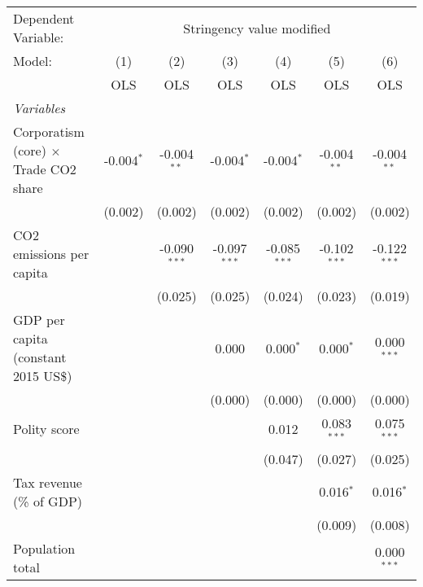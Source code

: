 
\begingroup
\centering
\begin{tabular}{lcccccc}
   \toprule
   Dependent Variable: & \multicolumn{6}{c}{Stringency value modified}\\
   Model:                                       & (1)          & (2)            & (3)            & (4)            & (5)            & (6)\\  
                                                &  OLS         & OLS            & OLS            & OLS            & OLS            & OLS\\  
   \midrule
   \emph{Variables}\\
   Corporatism (core) $\times$ Trade CO2 share  & -0.004$^{*}$ & -0.004$^{**}$  & -0.004$^{*}$   & -0.004$^{*}$   & -0.004$^{**}$  & -0.004$^{**}$\\   
                                                & (0.002)      & (0.002)        & (0.002)        & (0.002)        & (0.002)        & (0.002)\\   
   CO2 emissions per capita                     &              & -0.090$^{***}$ & -0.097$^{***}$ & -0.085$^{***}$ & -0.102$^{***}$ & -0.122$^{***}$\\   
                                                &              & (0.025)        & (0.025)        & (0.024)        & (0.023)        & (0.019)\\   
   GDP per capita (constant 2015 US\$)          &              &                & 0.000          & 0.000$^{*}$    & 0.000$^{*}$    & 0.000$^{***}$\\   
                                                &              &                & (0.000)        & (0.000)        & (0.000)        & (0.000)\\   
   Polity score                                 &              &                &                & 0.012          & 0.083$^{***}$  & 0.075$^{***}$\\   
                                                &              &                &                & (0.047)        & (0.027)        & (0.025)\\   
   Tax revenue (\% of GDP)                      &              &                &                &                & 0.016$^{*}$    & 0.016$^{*}$\\   
                                                &              &                &                &                & (0.009)        & (0.008)\\   
   Population total                             &              &                &                &                &                & 0.000$^{***}$\\   

\end{tabular}
